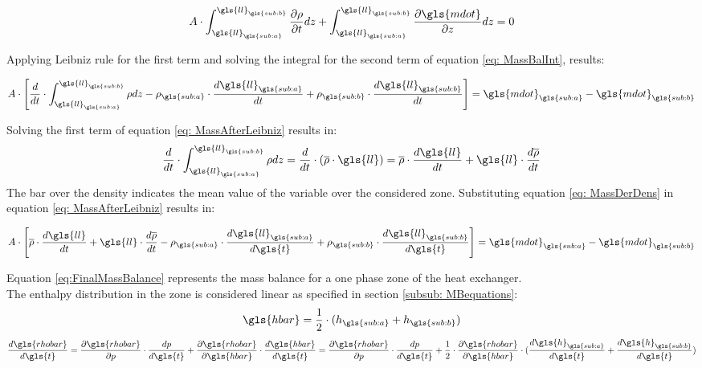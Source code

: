 \documentclass[11pt]{article} %
\begin{document}
\begin{equation}
A \cdot \int_{\gls{ll}_{\gls{sub:a}}}^{\gls{ll}_{\gls{sub:b}}}  \frac{\partial  \rho }{\partial t} dz + \int_{\gls{ll}_{\gls{sub:a}}}^{\gls{ll}_{\gls{sub:b}}} \frac{\partial \gls{mdot}}{\partial z} dz= 0
\label{eq: MassBalInt}
\end{equation}

Applying Leibniz rule for the first term and solving the integral for the second term of equation \ref{eq: MassBalInt}, results:

\begin{equation}
A \cdot \left[  \frac{d}{dt} \cdot \int_{\gls{ll}_{\gls{sub:a}}}^{\gls{ll}_{\gls{sub:b}}} \rho dz - \rho_{\gls{sub:a}}\cdot \frac{d\gls{ll}_{\gls{sub:a}}}{dt} + \rho_{\gls{sub:b}} \cdot \frac{d\gls{ll}_{\gls{sub:b}}}{dt} \right] = \gls{mdot}_{\gls{sub:a}} - \gls{mdot}_{\gls{sub:b}}
\label{eq: MassAfterLeibniz}
\end{equation}

Solving the  first term of equation \ref{eq: MassAfterLeibniz} results in:
\begin{equation}
 \frac{d}{dt} \cdot \int_{\gls{ll}_{\gls{sub:a}}}^{\gls{ll}_{\gls{sub:b}}} \rho dz =  \frac{d}{dt} \cdot (\overline{\rho} \cdot \gls{ll}) = \overline{\rho} \cdot \frac{d\gls{ll}}{dt} + \gls{ll} \cdot \frac{d\overline{\rho}}{dt}
\label{eq: MassDerDens}
\end{equation}
The bar over the density indicates the mean value of the variable over the considered zone. Substituting equation \ref{eq: MassDerDens} in equation \ref{eq: MassAfterLeibniz} results in:

\begin{equation}
\label{eq:FinalMassBalance}
A \cdot \left[  \overline{\rho} \cdot \frac{d\gls{ll}}{dt} + \gls{ll} \cdot \frac{d\overline{\rho}}{dt} - \rho_{\gls{sub:a}} \cdot \frac{d \gls{ll}_{\gls{sub:a}}}{d \gls{t}} + \rho_{\gls{sub:b}} \cdot \frac{d \gls{ll}_{\gls{sub:b}}}{d \gls{t}} \right] = \gls{mdot}_{\gls{sub:a}} -  \gls{mdot}_{\gls{sub:b}}
\end{equation}

Equation \ref{eq:FinalMassBalance} represents the mass balance for a one phase zone of the heat exchanger.\\ The enthalpy distribution in the zone is considered linear as specified in section \ref{subsub: MBequations}:
\begin{equation}
\label{eq:LinearEnth}
\gls{hbar} = \frac{1}{2} \cdot (h_{\gls{sub:a}} + h_{\gls{sub:b}})
\end{equation}
\begin{equation}
\label{eq:DensOnePhase}
\frac{d \gls{rhobar}}{d \gls{t}} =  \frac{\partial \gls{rhobar}}{\partial p} \cdot \frac{d p}{d \gls{t}} + \frac{\partial \gls{rhobar}}{\partial \gls{hbar}}\cdot \frac{d \gls{hbar}}{d \gls{t}} = 
\frac{\partial \gls{rhobar}}{\partial p} \cdot \frac{d p}{d \gls{t}} +  \frac{1}{2} \cdot \frac{\partial \gls{rhobar}}{\partial \gls{hbar}}  \cdot (\frac{d \gls{h}_{\gls{sub:a}}}{d \gls{t}} + \frac{d \gls{h}_{\gls{sub:b}}}{d \gls{t}})
\end{equation}
\end{document}
